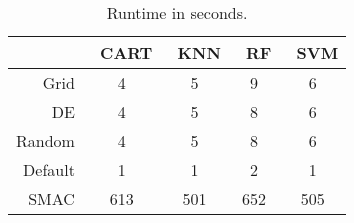 \begin{table}[!t]

\caption{Runtime in seconds.}\label{fig:runtime}
\vspace{-5pt}



\footnotesize
\begin{tabular}{r|cccc}


 & ~CART & ~KNN & ~RF & ~SVM \\ 
\hline
Grid    &  4  &   5    & 9 & 6 \\ 
DE      & 4  &   5    & 8 & 6 \\  
Random  & 4  &   5    & 8 & 6 \\ 
Default & 1  &   1    & 2   & 1 \\  
SMAC    & 613     &   501    & 652 & 505  \\ 


\end{tabular}
\vspace{-17pt}
\label{tbl:runtimes}
\end{table}
